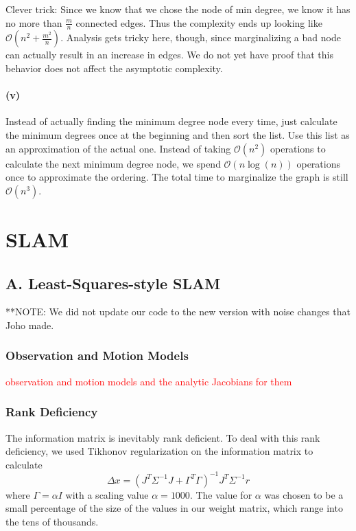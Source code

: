 \documentclass[12pt]{article}
\begin{document}
Clever trick: Since we know that we chose the node of min degree, we know it has
no more than $\frac{m}{n}$ connected edges. Thus the complexity ends up looking
like $\mathcal{O}(n^2 + \frac{m^2}{n})$. Analysis gets tricky here, though,
since marginalizing a bad node can actually result in an increase in edges. We
do not yet have proof that this behavior does not affect the asymptotic
complexity.

\paragraph{(v)}
Instead of actually finding the minimum degree node every time, just calculate
the minimum degrees once at the beginning and then sort the list. Use this list
as an approximation of the actual one. Instead of taking $\mathcal{O}(n^2)$
operations to calculate the next minimum degree node, we spend
$\mathcal{O}(n\log(n))$ operations once to approximate the ordering. The total
time to marginalize the graph is still $\mathcal{O}(n^3)$.

\section{SLAM}

\subsection*{A. Least-Squares-style SLAM}
**NOTE: We did not update our code to the new version with noise changes that Joho made.

\subsubsection*{Observation and Motion Models}
\textcolor{red}{observation and motion models and the analytic Jacobians for them}

\subsubsection*{Rank Deficiency}
The information matrix is inevitably rank deficient.  To deal with this rank deficiency, we used Tikhonov regularization on the information matrix to calculate 
$$\Delta x = (J^T \Sigma^{-1}J + \Gamma^T \Gamma)^{-1}J^T \Sigma^{-1} r$$
where $\Gamma = \alpha I$ with a scaling value $\alpha = 1000$.  The value for $\alpha$ was chosen to be a small percentage of the size of the values in our weight matrix, which range into the tens of thousands.
\end{document}
